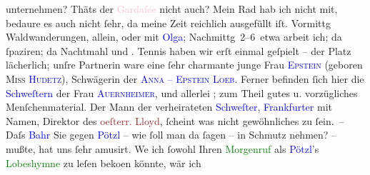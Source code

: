                unternehmen? Thäts der \textcolor{pink}{Gardaſee}{}\ledrightnote{\textcolor{pink}{Lago di Garda}} nicht auch?
               Mein Rad hab ich nicht mit, bedaure es auch nicht ſehr, da meine Zeit reichlich
               ausgefüllt iſt. Vormittg Waldwanderungen, allein, oder mit \textcolor{blue}{Olga}{}\ledrightnote{\textcolor{blue}{Olga Schnitzler}}; Nachmittg 2–6 etwa arbeit
               ich; da{\geminationn} ſpaziren; da{\geminationn}
               Nachtmahl und \label{K_L03009-5v}\label{K_L03009-5h}. Tennis haben wir erſt einmal geſpielt – der Platz
               lächerlich; unſre Partnerin ware eine ſehr charmante junge Frau \textsc{\textcolor{blue}{Epstein}{}\ledrightnote{\textcolor{blue}{Marie Epstein}}} (geboren \textsc{Miss \textcolor{blue}{Hudetz}{}\ledrightnote{\textcolor{blue}{Marie Epstein}}}), Schwägerin der \textsc{\textcolor{blue}{Anna – Epstein Loeb}{}\ledrightnote{\textcolor{blue}{Anna Epstein}}}. Ferner befinden ſich hier die \textcolor{blue}{Schweſtern}{}\ledrightnote{{$\rightarrow$}\textcolor{blue}{Leonie Guttmann}{\newline}{$\rightarrow$}\textcolor{blue}{Ella Frankfurter}} der Frau \textsc{\textcolor{blue}{Auernheimer}{}\ledrightnote{\textcolor{blue}{Irene Auernheimer}}}, und allerlei \label{K_L03009-6v}\label{K_L03009-6h}; zum Theil
               gutes u. vorzügliches Menſchenmaterial. Der Mann der verheirateten \textcolor{blue}{Schweſter}{}\ledrightnote{{$\rightarrow$}\textcolor{blue}{Ella Frankfurter}}, \textcolor{blue}{Frankfurter}{}\ledrightnote{\textcolor{blue}{Albert Frankfurter}} mit Namen, Direktor {\pb}des \textcolor{brown}{oeſterr.
                  Lloyd}{}\ledrightnote{\textcolor{brown}{Österreichischer Lloyd}}, ſcheint was nicht gewöhnliches zu ſein. – Daſs \textcolor{blue}{Bahr}{}\ledrightnote{\textcolor{blue}{Hermann Bahr}} Sie gegen \textcolor{blue}{Pötzl}{}\ledrightnote{\textcolor{blue}{Eduard Pötzl}} –
               wie ſoll man da ſagen – in Schmutz nehmen? – mußte, hat uns ſehr amusirt. We{\geminationn} ich ſowohl Ihren \textcolor{green}{\textcolor{green}{Morgen}{}\ledrightnote{\textcolor{green}{Morgen. Wochenschrift für deutsche Kultur}}ruf}{}\ledrightnote{{$\rightarrow$}\textcolor{green}{Der Wiener Korrespondent}} als \textcolor{blue}{Pötzl}{}\ledrightnote{\textcolor{blue}{Eduard Pötzl}}’s \textcolor{green}{Lobeshymne}{}\ledrightnote{{$\rightarrow$}\textcolor{green}{Das gelobte Wien}} zu leſen beko{\geminationm}en könnte, wär ich
